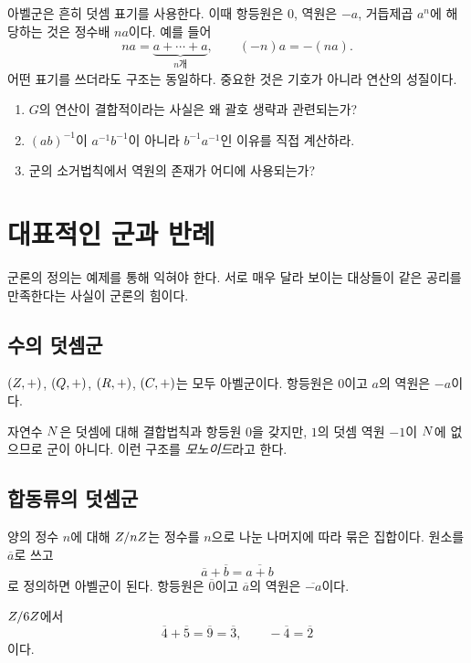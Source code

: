 아벨군은 흔히 덧셈 표기를 사용한다. 이때 항등원은 $0$, 역원은 $-a$, 거듭제곱 $a^n$에 해당하는 것은 정수배 $na$이다. 예를 들어
\[
  n a=\underbrace{a+\cdots+a}_{n\text{개}},\qquad (-n)a=-(na).
\]
어떤 표기를 쓰더라도 구조는 동일하다. 중요한 것은 기호가 아니라 연산의 성질이다.

\begin{checkpoint}
\begin{enumerate}[label=\arabic*.]
  \item $G$의 연산이 결합적이라는 사실은 왜 괄호 생략과 관련되는가?
  \item $(ab)^{-1}$이 $a^{-1}b^{-1}$이 아니라 $b^{-1}a^{-1}$인 이유를 직접 계산하라.
  \item 군의 소거법칙에서 역원의 존재가 어디에 사용되는가?
\end{enumerate}
\end{checkpoint}

\section{대표적인 군과 반례}
\label{sec:group-examples}

군론의 정의는 예제를 통해 익혀야 한다. 서로 매우 달라 보이는 대상들이 같은 공리를 만족한다는 사실이 군론의 힘이다.

\subsection{수의 덧셈군}

\begin{example}
$(Z,+)$, $(Q,+)$, $(R,+)$, $(C,+)$는 모두 아벨군이다. 항등원은 $0$이고 $a$의 역원은 $-a$이다.
\end{example}

자연수 $N$은 덧셈에 대해 결합법칙과 항등원 $0$을 갖지만, $1$의 덧셈 역원 $-1$이 $N$에 없으므로 군이 아니다. 이런 구조를 \emph{모노이드}라고 한다.

\subsection{합동류의 덧셈군}

양의 정수 $n$에 대해 $Z/nZ$는 정수를 $n$으로 나눈 나머지에 따라 묶은 집합이다. 원소를 $\overline a$로 쓰고
\[
  \overline a+\overline b=\overline{a+b}
\]
로 정의하면 아벨군이 된다. 항등원은 $\overline0$이고 $\overline a$의 역원은 $\overline{-a}$이다.

\begin{example}
$Z/6Z$에서
\[
  \overline4+\overline5=\overline9=\overline3,
  \qquad -\overline4=\overline2
\]
이다.
\end{example}

